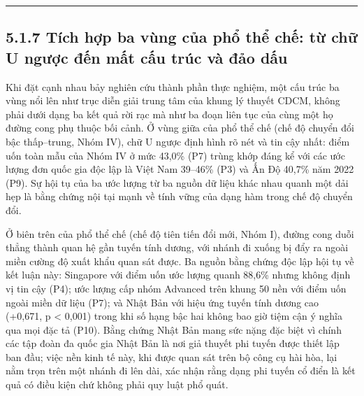 \documentclass[
  a4paper,
  13pt]{extreport}
\begin{document}
\begin{center}\rule{0.5\linewidth}{0.5pt}\end{center}

\hypertarget{tuxedch-hux1ee3p-ba-vuxf9ng-cux1ee7a-phux1ed5-thux1ec3-chux1ebf-tux1eeb-chux1eef-u-ngux1b0ux1ee3c-ux111ux1ebfn-mux1ea5t-cux1ea5u-truxfac-vuxe0-ux111ux1ea3o-dux1ea5u}{%
\subsection{5.1.7 Tích hợp ba vùng của phổ thể chế: từ chữ U ngược đến
mất cấu trúc và đảo
dấu}\label{tuxedch-hux1ee3p-ba-vuxf9ng-cux1ee7a-phux1ed5-thux1ec3-chux1ebf-tux1eeb-chux1eef-u-ngux1b0ux1ee3c-ux111ux1ebfn-mux1ea5t-cux1ea5u-truxfac-vuxe0-ux111ux1ea3o-dux1ea5u}}

Khi đặt cạnh nhau bảy nghiên cứu thành phần thực nghiệm, một cấu trúc ba
vùng nổi lên như trục diễn giải trung tâm của khung lý thuyết CDCM,
không phải dưới dạng ba kết quả rời rạc mà như ba đoạn liên tục của cùng
một họ đường cong phụ thuộc bối cảnh. Ở vùng giữa của phổ thể chế (chế
độ chuyển đổi bậc thấp--trung, Nhóm IV), chữ U ngược định hình rõ nét và
tin cậy nhất: điểm uốn toàn mẫu của Nhóm IV ở mức 43,0\% (P7) trùng khớp
đáng kể với các ước lượng đơn quốc gia độc lập là Việt Nam 39--46\% (P3)
và Ấn Độ 40,7\% năm 2022 (P9). Sự hội tụ của ba ước lượng từ ba nguồn dữ
liệu khác nhau quanh một dải hẹp là bằng chứng nội tại mạnh về tính vững
của dạng hàm trong chế độ chuyển đổi.

Ở biên trên của phổ thể chế (chế độ tiên tiến đổi mới, Nhóm I), đường
cong duỗi thẳng thành quan hệ gần tuyến tính dương, với nhánh đi xuống
bị đẩy ra ngoài miền cường độ xuất khẩu quan sát được. Ba nguồn bằng
chứng độc lập hội tụ về kết luận này: Singapore với điểm uốn ước lượng
quanh 88,6\% nhưng không định vị tin cậy (P4); ước lượng cấp nhóm
Advanced trên khung 50 nền với điểm uốn ngoài miền dữ liệu (P7); và Nhật
Bản với hiệu ứng tuyến tính dương cao (+0,671, p \textless{} 0,001)
trong khi số hạng bậc hai không bao giờ tiệm cận ý nghĩa qua mọi đặc tả
(P10). Bằng chứng Nhật Bản mang sức nặng đặc biệt vì chính các tập đoàn
đa quốc gia Nhật Bản là nơi giả thuyết phi tuyến được thiết lập ban đầu;
việc nền kinh tế này, khi được quan sát trên bộ công cụ hài hòa, lại nằm
trọn trên một nhánh đi lên dài, xác nhận rằng dạng phi tuyến cổ điển là
kết quả có điều kiện chứ không phải quy luật phổ quát.
\end{document}
